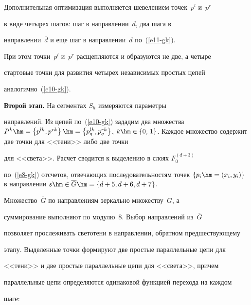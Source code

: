   





  


  Дополнительная оптимизация выполняется шевелением точек~$p^l$ и~$p^r$ 


в виде четырех шагов: шаг в направлении~$d$, два шага в 


направлении~$\overline{d}$ и еще шаг в направлении~$d$ по~(\ref{e11-gk}). 


При этом точки~$p^l$ и~$p^r$ расщепляются и образуются не две, а четыре 


стартовые точки для развития четырех независимых простых цепей 


аналогично~(\ref{e10-gk}).








  \textbf{Второй этап.} На сегментах $S_h$ измеряются параметры 


направлений. Из цепей по~(\ref{e10-gk}) зададим два множества $P^k\hm= 


\left\{ p^{lk},p^{rk}\right\} \hm= \left\{ p_q^{lk},p_q^{rk}\right\}$, $k\hm\in 


\{0,\,1\}$. Каждое множество содержит две точки для <<тени>> либо две точки 


для <<света>>. Расчет сводится к выделению в слоях $F_0^{(d+3)}$ 


по~(\ref{e8-gk}) отсчетов, отвечающих последовательностям точек $\{p_i\hm= 


(x_i,y_i)\}$ в направлении $s\hm\in \overline{G}\hm= \{d+5,d+6,d+7\}$. 


Множество~$\overline{G}$ по направлениям зеркально множеству~$G$, а 


суммирование выполняют по модулю~8. Выбор направлений из~$\overline{G}$ 


позволяет прослеживать светотени в направлении, обратном предшествующему 


этапу. Выделенные точки формируют две простые параллельные цепи для 


<<тени>> и две простые параллельные цепи для <<света>>, причем 


параллельные цепи определяются одинаковой функцией перехода на каждом 


шаге:


